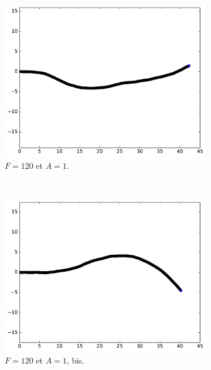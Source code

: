 	\begin{figure}[!htb]
		\begin{subfigure}[t]{0.49\textwidth}
			\centering
			\includegraphics[width=\textwidth]{figures/ch4/ac_2_19_1_120a}
			\caption[Mouvement pseudo-autocorrélé A]{$F = 120$ et $A = 1$.}
			\label{fig:ac1_120A}
		\end{subfigure}
		~
		\begin{subfigure}[t]{0.49\textwidth}
			\centering
			\includegraphics[width=\textwidth]{figures/ch4/ac_2_19_1_120b}
			\caption[Mouvement pseudo-autocorrélé B]{$F = 120$ et $A = 1$, bis.}
			\label{fig:ac_1_120B}
		\end{subfigure}
		~
		\begin{subfigure}[t]{0.49\textwidth}

\end{subfigure}
\end{figure}
